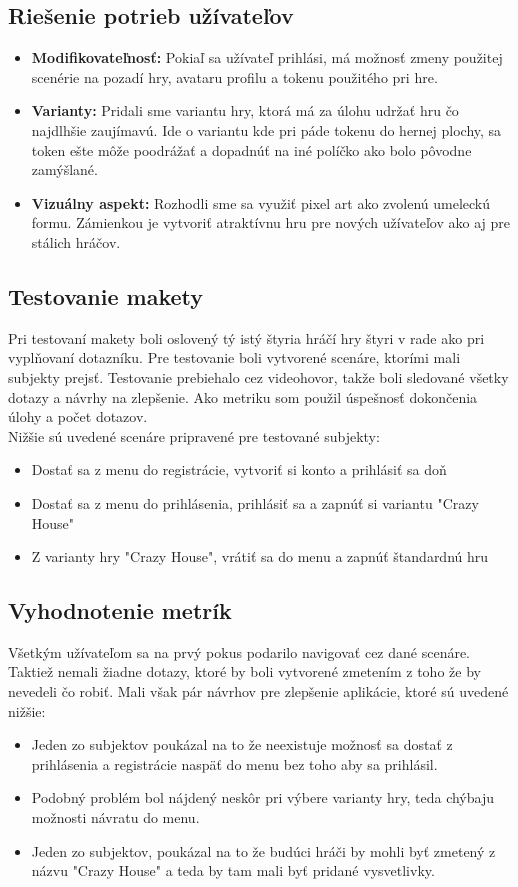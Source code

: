 \documentclass[a4paper, 11pt, onecolumn]{article}
\begin{document}
\subsection*{Riešenie potrieb užívateľov}
\begin{itemize}
  \item \textbf{Modifikovateľnosť:} Pokiaľ sa užívateľ prihlási, má možnosť zmeny 
               použitej scenérie na pozadí hry, avataru profilu a tokenu použitého pri hre.
  \item \textbf{Varianty:} Pridali sme variantu hry, ktorá má za úlohu udržať hru čo najdlhšie
                zaujímavú. Ide o variantu kde pri páde tokenu do hernej plochy, sa token
                ešte môže poodrážať a dopadnúť na iné políčko ako bolo pôvodne zamýšlané.
  \item \textbf{Vizuálny aspekt:} Rozhodli sme sa využiť pixel art ako zvolenú umeleckú formu.
                Zámienkou je vytvoriť atraktívnu hru pre nových užívateľov ako aj pre stálich hráčov.
\end{itemize}
\subsection{Testovanie makety}
Pri testovaní makety boli oslovený tý istý štyria hráčí hry štyri v rade ako pri
vyplňovaní dotazníku. Pre testovanie boli vytvorené scenáre, ktorími mali 
subjekty prejsť. Testovanie prebiehalo cez videohovor, takže boli sledované všetky
dotazy a návrhy na zlepšenie. Ako metriku som použil úspešnosť dokončenia úlohy a
počet dotazov.\\
Nižšie sú uvedené scenáre pripravené pre testované subjekty:
\begin{itemize}
  \item Dostať sa z menu do registrácie, vytvoriť si konto a prihlásiť sa doň
  \item Dostať sa z menu do prihlásenia, prihlásiť sa a zapnúť si variantu "Crazy House"
  \item Z varianty hry "Crazy House", vrátiť sa do menu a zapnúť štandardnú hru
\end{itemize}
\subsection*{Vyhodnotenie metrík}
Všetkým užívateľom sa na prvý pokus podarilo navigovať cez dané scenáre. 
Taktiež nemali žiadne dotazy, ktoré by boli vytvorené zmetením z toho že by 
nevedeli čo robiť. Mali však pár návrhov pre zlepšenie aplikácie, ktoré sú uvedené 
nižšie:
\begin{itemize}
  \item Jeden zo subjektov poukázal na to že neexistuje možnosť sa dostať z prihlásenia a registrácie naspäť do menu bez toho aby sa prihlásil.
  \item Podobný problém bol nájdený neskôr pri výbere varianty hry, teda chýbaju možnosti návratu do menu.
  \item Jeden zo subjektov, poukázal na to že budúci hráči by mohli byť zmetený z názvu "Crazy House" a teda by tam mali byť pridané vysvetlivky.
\end{itemize}
\end{document}
